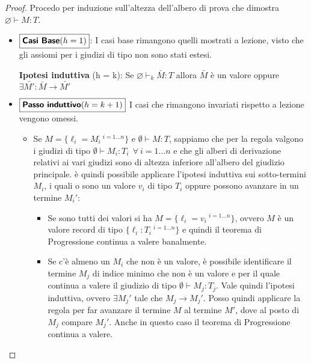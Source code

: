 \begin{proof}
Procedo per induzione sull'altezza dell'albero di prova che dimostra
$\varnothing \vdash M : T$.
\begin{itemize}
	\item $\boxed{\text{\textbf{Casi Base}} (h = 1)}$: I casi base rimangono
	quelli mostrati a lezione, visto che gli assiomi per i giudizi di tipo non
	sono stati estesi. \vspace{.5em}

	\noindent \textbf{Ipotesi induttiva} (h = k): Se $\varnothing \vdash_{k} \bar{M} : T$ allora $\bar{M}$ \`e un valore oppure $\exists
	\bar{M'}: \bar{M} \longrightarrow \bar{M'}$
	\item $\boxed{\text{\textbf{Passo induttivo}} (h = k+1)}$ I casi che rimangono invariati rispetto a lezione vengono omessi. %
	

	\begin{itemize}
		\item {} Se $M = \{ \ell_i = M_i \:^{i = 1 \ldots n} \}$ e $\emptyset \vdash M : T$, sappiamo che per la regola  valgono i giudizi di tipo
		$\emptyset \vdash M_i : T_i \:\ \forall \: i = 1\ldots n$ e che gli alberi di derivazione relativi ai vari giudizi sono di altezza inferiore all'albero del giudizio principale.
		\`e quindi possibile applicare l'ipotesi induttiva sui sotto-termini $M_i$, i quali o sono un valore $v_i$ di tipo $T_i$ oppure possono avanzare in un termine $M_i'$:
		\begin{itemize}
			\item Se sono tutti dei valori si ha $M = \{ \ell_i = v_i \:^{i = 1 \ldots n} \}$, ovvero $M$ \`e un valore record di tipo $\{ \ell_i : T_i \:^{i = 1 \ldots n} \}$ e quindi il teorema di Progressione continua a valere banalmente.
			\item Se c'\`e almeno un $M_i$ che non \`e un valore, \`e possibile identificare il termine $M_j$ di indice minimo che non \`e un valore e per il quale continua a valere il giudizio di tipo $\emptyset \vdash M_j : T_j$. Vale quindi l'ipotesi induttiva, ovvero $\exists M_j'$ tale che $M_j \to M_j'$. Posso quindi applicare la regola  per far avanzare il termine $M$ al termine $M'$, dove al posto di $M_j$ compare $M_j'$. Anche in questo caso il teorema di Progressione continua a valere.
		\end{itemize}
	

\end{itemize}
\end{itemize}
\end{proof}
